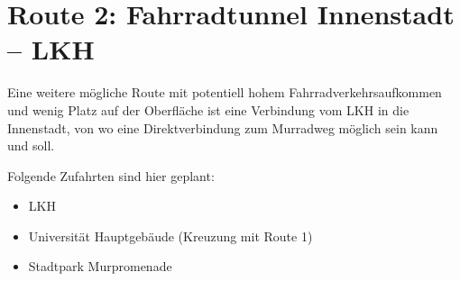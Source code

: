 \section{Route 2: Fahrradtunnel Innenstadt -- LKH}
Eine weitere mögliche Route mit potentiell hohem Fahrradverkehrsaufkommen und wenig Platz auf der Oberfläche ist eine Verbindung vom LKH in die Innenstadt, von wo eine Direktverbindung zum Murradweg möglich sein kann und soll.

Folgende Zufahrten sind hier geplant:
\begin{itemize}
    \item LKH
    \item Universität Hauptgebäude (Kreuzung mit Route 1)
    \item Stadtpark Murpromenade
\end{itemize}


